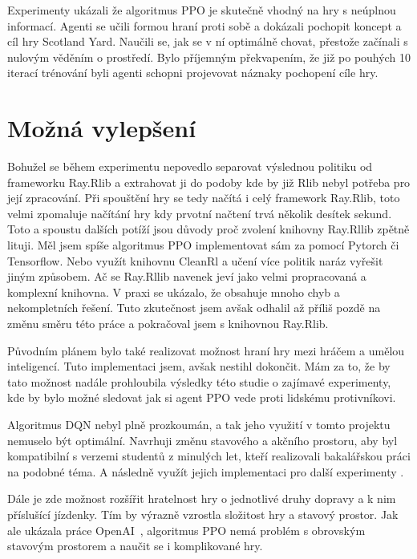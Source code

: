 Experimenty ukázali že algoritmus PPO je skutečně vhodný na hry s neúplnou informací.
Agenti se učili formou hraní proti sobě a dokázali pochopit koncept a cíl hry Scotland Yard.
Naučili se, jak se v ní optimálně chovat, přestože začínali s nulovým věděním o prostředí.
Bylo příjemným překvapením, že již po pouhých 10 iterací trénování byli agenti schopni projevovat náznaky pochopení cíle hry.

\section*{Možná vylepšení}
\label{sec:mozna-vylepseni}

Bohužel se během experimentu nepovedlo separovat výslednou politiku od frameworku Ray.Rlib a extrahovat ji do podoby kde by již Rlib nebyl potřeba pro její zpracování.
Při spouštění hry se tedy načítá i celý framework Ray.Rlib, toto velmi zpomaluje načítání hry kdy prvotní načtení trvá několik desítek sekund.
Toto a spoustu dalších potíží jsou důvody proč zvolení knihovny Ray.Rllib zpětně lituji.
Měl jsem spíše algoritmus PPO implementovat sám za pomocí Pytorch či Tensorflow.
Nebo využít knihovnu CleanRl a učení více politik naráz vyřešit jiným způsobem.
Ač se Ray.Rllib navenek jeví jako velmi propracovaná a komplexní knihovna.
V praxi se ukázalo, že obsahuje mnoho chyb a nekompletních řešení.
Tuto zkutečnost jsem avšak odhalil až příliš pozdě na změnu směru této práce a pokračoval jsem s knihovnou Ray.Rlib.

Původním plánem bylo také realizovat možnost hraní hry mezi hráčem a umělou inteligencí.
Tuto implementaci jsem, avšak nestihl dokončit.
Mám za to, že by tato možnost nadále prohloubila výsledky této studie o zajímavé experimenty, kde by bylo možné sledovat jak si agent PPO vede proti lidskému protivníkovi.

Algoritmus DQN nebyl plně prozkoumán, a tak jeho využití v tomto projektu nemuselo být optimální.
Navrhuji změnu stavového a akčního prostoru, aby byl kompatibilní s verzemi studentů z minulých let, kteří realizovali bakalářskou práci na podobné téma.
A následně využít jejich implementaci pro další experimenty \cite{Hrklova2023thesis}.

Dále je zde možnost rozšířit hratelnost hry o jednotlivé druhy dopravy a k nim příslušící jízdenky.
Tím by výrazně vzrostla složitost hry a stavový prostor.
Jak ale ukázala práce OpenAI~\cite{Dota2}, algoritmus PPO nemá problém s obrovským stavovým prostorem a naučit se i komplikované hry.




%
